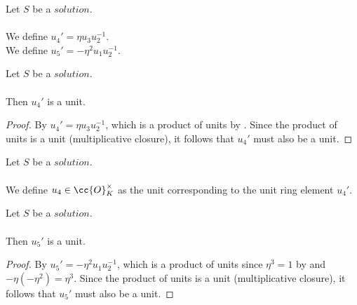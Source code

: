 \begin{definition}[$u_4',u_5'$]
  \label{def:Solution_u4_u5_prime}
  \leanok
  Let $S$ be a $solution$.\\\\
  We define $u_4' = \eta u_3 u_2^{-1}$.\\
  We define $u_5' = -\eta^2 u_1 u_2^{-1}$.\\
\end{definition}

\begin{lemma}
  \label{lmm:u₄_isUnit}
  \leanok
  Let $S$ be a $solution$.\\\\
  Then $u_4'$ is a unit.
\end{lemma}
\begin{proof}
  \leanok
  By  $u_4' = \eta u_3 u_2^{-1}$,
  which is a product of units by .
  Since the product of units is a unit (multiplicative closure),
  it follows that $u_4'$ must also be a unit.
\end{proof}

\begin{definition}[$u_4$]
  \label{def:Solution_u4}
  \leanok
  Let $S$ be a $solution$.\\\\
  We define $u_4 \in \cc{O}^\times_K$ as the unit corresponding
  to the unit ring element $u_4'$.
\end{definition}

\begin{lemma}
  \label{lmm:u₅_isUnit}
  \leanok
  Let $S$ be a $solution$.\\\\
  Then $u_5'$ is a unit.
\end{lemma}
\begin{proof}
  \leanok
  By  $u_5' = -\eta^2 u_1 u_2^{-1}$,
  which is a product of units since $\eta^3 = 1$ by  and
  $-\eta (-\eta^2) = \eta^3$.
  Since the product of units is a unit (multiplicative closure),
  it follows that $u_5'$ must also be a unit.
\end{proof}

